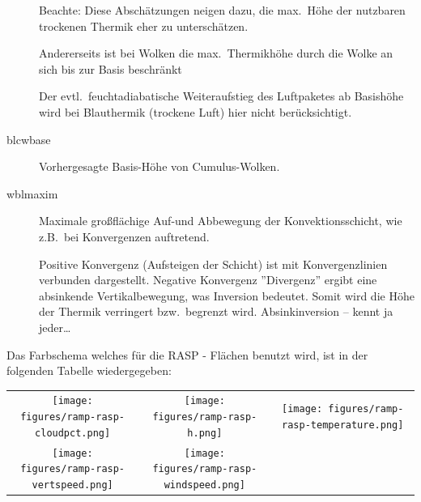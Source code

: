 \begin{description}
Beachte: Diese Abschätzungen neigen dazu, die max.\ Höhe der
nutzbaren trockenen Thermik eher zu unterschätzen.

Andererseits ist bei Wolken die max.\ Thermikhöhe durch  die Wolke an sich bis
zur Basis  beschränkt

Der evtl.\ feuchtadiabatische Weiteraufstieg des Luftpaketes ab Basishöhe wird bei
Blauthermik (trockene Luft) hier nicht berücksichtigt.
\item[blcwbase] Vorhergesagte Basis-Höhe von Cumulus-Wolken.

\item[wblmaxim] Maximale großflächige Auf-und Abbewegung der Konvektionsschicht, wie
z.B.\ bei Konvergenzen auftretend.

Positive Konvergenz (Aufsteigen der Schicht) ist mit Konvergenzlinien verbunden dargestellt.
Negative Konvergenz ''Divergenz'' ergibt eine absinkende Vertikalbewegung, was Inversion bedeutet.
Somit wird die Höhe der Thermik verringert bzw.\ begrenzt wird.
Absinkinversion -- kennt ja jeder\dots
\end{description}
\begin{maxipage}
Das Farbschema welches für die RASP - Flächen benutzt wird, ist in der folgenden Tabelle wiedergegeben:

\begin{longtable}{c c c}
\texttt{[image: figures/ramp-rasp-cloudpct.png]}&

\texttt{[image: figures/ramp-rasp-h.png]}&

\texttt{[image: figures/ramp-rasp-temperature.png]}\\

\texttt{[image: figures/ramp-rasp-vertspeed.png]}&
\texttt{[image: figures/ramp-rasp-windspeed.png]}& \\

\end{longtable}
\end{maxipage}
